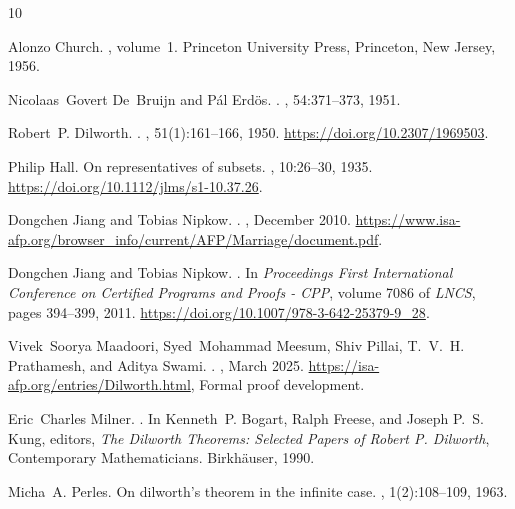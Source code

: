 \documentclass[11pt,a4paper]{article}
\begin{document}
\begin{thebibliography}{10}

Alonzo Church.
, volume~1.
\newblock Princeton University Press, Princeton, New Jersey, 1956.

Nicolaas~Govert De~Bruijn and Pál Erdös.
.
, 54:371--373, 1951.

Robert~P. Dilworth.
.
, 51(1):161--166, 1950.
\newblock \url{https://doi.org/10.2307/1969503}.

Philip Hall.
\newblock On representatives of subsets.
, 10:26--30, 1935.
\newblock \url{ https://doi.org/10.1112/jlms/s1-10.37.26}.

Dongchen Jiang and Tobias Nipkow.
.
, December 2010.
\newblock \url{https://www.isa-afp.org/browser_info/current/AFP/Marriage/document.pdf}.

Dongchen Jiang and Tobias Nipkow.
.
\newblock In {\em Proceedings First International Conference on Certified Programs and Proofs - {CPP}}, volume 7086 of {\em LNCS}, pages 394--399, 2011.
\newblock \url{https://doi.org/10.1007/978-3-642-25379-9\_28}.

Vivek~Soorya Maadoori, Syed~Mohammad Meesum, Shiv Pillai, T.~V.~H. Prathamesh, and Aditya Swami.
.
, March 2025.
\newblock \url{https://isa-afp.org/entries/Dilworth.html}, Formal proof development.

Eric~Charles Milner.
.
\newblock In Kenneth~P. Bogart, Ralph Freese, and Joseph P.~S. Kung, editors, {\em The Dilworth Theorems: Selected Papers of Robert P. Dilworth}, Contemporary Mathematicians. Birkh\"auser, 1990.

Micha~A. Perles.
\newblock On dilworth's theorem in the infinite case.
, 1(2):108--109, 1963.


\end{thebibliography}
\end{document}
